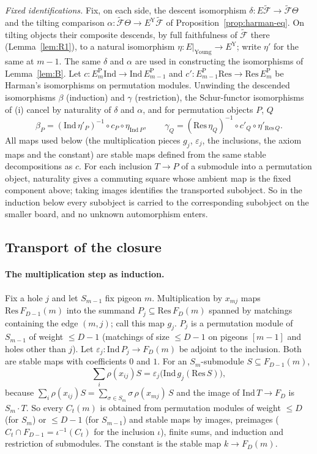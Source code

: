 \emph{Fixed identifications.}  Fix, on each side, the descent isomorphism
$\delta\colon E\tilde{\mathcal F}\to\tilde{\mathcal F}\Theta$ and the tilting comparison
$\alpha\colon\tilde{\mathcal F}\Theta\to E^{\mathrm Y}\tilde{\mathcal F}$ of
Proposition~\ref{prop:harman-eq}.  On tilting objects their composite descends, by full
faithfulness of $\tilde{\mathcal F}$ there (Lemma~\ref{lem:R1}), to a natural isomorphism
$\eta\colon E|_{\mathrm{Young}}\to E^{\mathrm Y}$; write $\eta'$ for the same at $m-1$.  The same
$\delta$ and $\alpha$ are used in constructing the isomorphisms of Lemma~\ref{lem:B}.  Let
$c\colon E^{\mathrm P}_m\mathrm{Ind}\to\mathrm{Ind}\,E^{\mathrm P}_{m-1}$ and
$c'\colon E^{\mathrm P}_{m-1}\mathrm{Res}\to\mathrm{Res}\,E^{\mathrm P}_m$ be Harman's
isomorphisms on permutation modules.  Unwinding the descended isomorphisms $\beta$ (induction)
and $\gamma$ (restriction), the Schur-functor isomorphisms of (i) cancel by naturality of
$\delta$ and $\alpha$, and for permutation objects $P$, $Q$
\[
  \beta_P=(\mathrm{Ind}\,\eta'_P)^{-1}\circ c_P\circ\eta_{\mathrm{Ind}\,P},\qquad
  \gamma_Q=(\mathrm{Res}\,\eta_Q)^{-1}\circ c'_Q\circ\eta'_{\mathrm{Res}\,Q}.
\]
All maps used below (the multiplication pieces $g_j$, $\varepsilon_j$, the inclusions, the
axiom maps and the constant) are stable maps defined from the same stable decompositions as
$c$.  For each inclusion $T\to P$ of a submodule into a permutation object, naturality gives a
commuting square whose ambient map is the fixed component above; taking images identifies the
transported subobject.  So in the induction below every subobject is carried to the
corresponding subobject on the smaller board, and no unknown automorphism enters.

\subsection{Transport of the closure}\label{app:transport}

\paragraph{The multiplication step as induction.}  Fix a hole $j$ and let $S_{m-1}$ fix pigeon
$m$.  Multiplication by $x_{mj}$ maps $\mathrm{Res}\,F_{D-1}(m)$ into the summand
$P_j\subseteq\mathrm{Res}\,F_D(m)$ spanned by matchings containing the edge $(m,j)$; call this
map $g_j$.  $P_j$ is a permutation module of $S_{m-1}$ of weight $\le D-1$ (matchings of size
$\le D-1$ on pigeons $[m-1]$ and holes other than $j$).  Let
$\varepsilon_j\colon\mathrm{Ind}\,P_j\to F_D(m)$ be adjoint to the inclusion.  Both are stable
maps with coefficients $0$ and $1$.  For an $S_m$-submodule $S\subseteq F_{D-1}(m)$,
\[
  \textstyle\sum_i\rho(x_{ij})S=\varepsilon_j\bigl(\mathrm{Ind}\,g_j(\mathrm{Res}\,S)\bigr),
\]
because $\sum_i\rho(x_{ij})S=\sum_{\sigma\in S_m}\sigma\,\rho(x_{mj})\,S$ and the image of
$\mathrm{Ind}\,T\to F_D$ is $S_m\cdot T$.  So every $C_t(m)$ is obtained from permutation
modules of weight $\le D$ (for $S_m$) or $\le D-1$ (for $S_{m-1}$) and stable maps by images,
preimages ($C_t\cap F_{D-1}=\iota^{-1}(C_t)$ for the inclusion $\iota$), finite sums, and
induction and restriction of submodules.  The constant is the stable map $k\to F_D(m)$.

